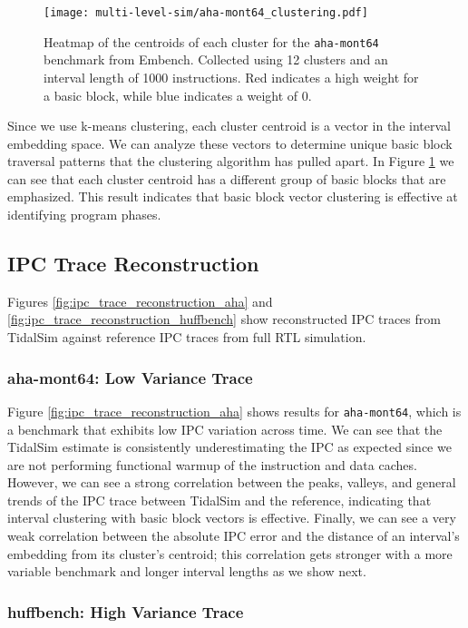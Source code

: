 \documentclass[sigplan,nonacm,10pt]{acmart}
\begin{document}
\begin{figure}
  \texttt{[image: multi-level-sim/aha-mont64\_clustering.pdf]}
  \caption{Heatmap of the centroids of each cluster for the \texttt{aha-mont64} benchmark from Embench. Collected using 12 clusters and an interval length of 1000 instructions. Red indicates a high weight for a basic block, while blue indicates a weight of 0.}
  \label{fig:interval_clustering}
\end{figure}

Since we use k-means clustering, each cluster centroid is a vector in the interval embedding space.
We can analyze these vectors to determine unique basic block traversal patterns that the clustering algorithm has pulled apart.
In Figure \ref{fig:interval_clustering} we can see that each cluster centroid has a different group of basic blocks that are emphasized.
This result indicates that basic block vector clustering is effective at identifying program phases.

\subsection{IPC Trace Reconstruction}

Figures \ref{fig:ipc_trace_reconstruction_aha} and \ref{fig:ipc_trace_reconstruction_huffbench} show reconstructed IPC traces from TidalSim against reference IPC traces from full RTL simulation.

\subsubsection{aha-mont64: Low Variance Trace}

Figure \ref{fig:ipc_trace_reconstruction_aha} shows results for \texttt{aha-mont64}, which is a benchmark that exhibits low IPC variation across time.
We can see that the TidalSim estimate is consistently underestimating the IPC as expected since we are not performing functional warmup of the instruction and data caches.
However, we can see a strong correlation between the peaks, valleys, and general trends of the IPC trace between TidalSim and the reference, indicating that interval clustering with basic block vectors is effective.
Finally, we can see a very weak correlation between the absolute IPC error and the distance of an interval's embedding from its cluster's centroid; this correlation gets stronger with a more variable benchmark and longer interval lengths as we show next.

\subsubsection{huffbench: High Variance Trace}
\end{document}
